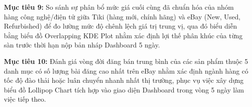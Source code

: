 \textbf{Mục tiêu 9:} So sánh sự phân bổ mức giá cuối cùng đã chuẩn hóa của nhóm hàng công nghệ/điện tử giữa Tiki (hàng mới, chính hãng) và eBay (New, Used, Refurbished) để đo lường mức độ chênh lệch giá trị trung vị, qua đó biểu diễn bằng biểu đồ Overlapping KDE Plot nhằm xác định lợi thế phân khúc của từng sàn trước thời hạn nộp bản nháp Dashboard 5 ngày.

\textbf{Mục tiêu 10:} Đánh giá vòng đời đăng bán trung bình của các sản phẩm thuộc 5 danh mục có số lượng bài đăng cao nhất trên eBay nhằm xác định ngành hàng có tốc độ đào thải hoặc luân chuyển nhanh nhất thị trường, phục vụ việc xây dựng biểu đồ Lollipop Chart tích hợp vào giao diện Dashboard trong vòng 5 ngày làm việc tiếp theo.

\clearpage
